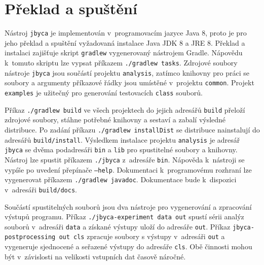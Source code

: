 \section{Překlad a spuštění}\label{ToolRun}

Nástroj \texttt{jbyca} je implementován v~programovacím jazyce Java 8, proto je pro jeho překlad a spuštění vyžadovaná instalace Java JDK 8 a JRE 8.
Překlad a instalaci zajišťuje skript \texttt{gradlew} vygenerovaný nástrojem Gradle. Nápovědu k~tomuto skriptu lze vypsat příkazem \texttt{./gradlew tasks}. 
Zdrojové soubory nástroje \texttt{jbyca} jsou součástí projektu \texttt{analysis}, zatímco knihovny pro práci se soubory a argumenty příkazové řádky jsou umístěné v~projektu \texttt{common}. Projekt \texttt{examples} je užitečný pro generování testovacích \texttt{class} souborů.

Příkaz \texttt{./gradlew build} ve všech projektech do jejich adresářů \texttt{build} přeloží zdrojové soubory, stáhne potřebné knihovny a sestaví a zabalí výsledné distribuce. Po zadání příkazu \texttt{./gradlew installDist} se distribuce nainstalují do adresářů \texttt{build/install}. Výsledkem instalace projektu \texttt{analysis} je adresář \texttt{jbyca} se dvěma podadresáři \texttt{bin} a \texttt{lib} pro spustitelné soubory a knihovny. Nástroj lze spustit příkazem \texttt{./jbyca} z~adresáře \texttt{bin}. Nápověda k~nástroji se vypíše po uvedení přepínače \texttt{---help}. Dokumentaci k~programovému rozhraní lze vygenerovat příkazem \texttt{./gradlew javadoc}. Dokumentace bude k~dispozici v~adresáři \texttt{build/docs}.

Součástí spustitelných souborů jsou dva nástroje pro vygenerování a zpracování výstupů programu. Příkaz \texttt{./jbyca-experiment data out} spustí sérii analýz souborů v~adresáři \texttt{data} a získané výstupy uloží do adresáře \texttt{out}. Příkaz \texttt{jbyca-postprocessing out cls} zpracuje soubory s výstupy v~adresáři \texttt{out} a vygeneruje sjednocené a seřazené výstupy do adresáře \texttt{cls}. Obě činnosti mohou být v~závislosti na velikosti vstupních dat časově náročné.







